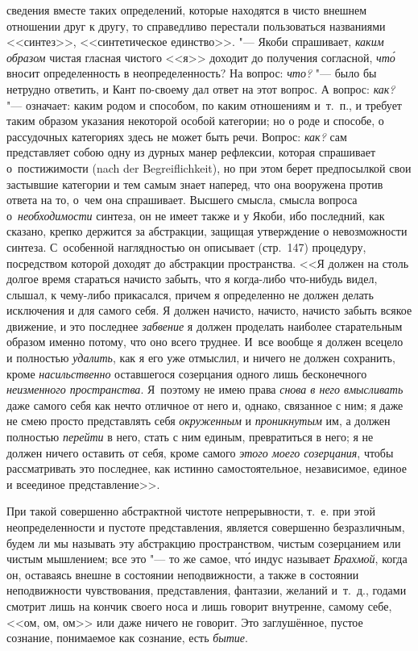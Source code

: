 сведения вместе таких определений, которые находятся в чисто внешнем отношении
друг к другу, то справедливо перестали пользоваться названиями <<синтез>>,
<<синтетическое единство>>. "--- Якоби спрашивает, {\em каким} {\em образом}
чистая гласная чистого <<я>> доходит до получения согласной, {\em чт\'{о}}
вносит определенность в неопределенность? На вопрос: {\em что?} "--- было бы
нетрудно ответить, и Кант по-своему дал ответ на этот вопрос. А вопрос:
{\em как?} "--- означает: каким родом и способом, по каким отношениям и~т.~п.,
и требует таким образом указания некоторой особой категории; но о роде и
способе, о рассудочных категориях здесь не может быть речи. Вопрос: {\em как?}
сам представляет собою одну из дурных манер рефлексии, которая спрашивает
о~постижимости (nach der Begrei\-flich\-keit), но при этом берет предпосылкой
свои застывшие категории и тем самым знает наперед, что она вооружена против
ответа на то, о~чем она спрашивает. Высшего смысла, смысла вопроса
о~{\em необходимости} синтеза, он не имеет также и у Якоби, ибо последний, как
сказано, крепко держится за абстракции, защищая утверждение о невозможности
синтеза. С~особенной наглядностью он описывает (стр.~147) процедуру,
посредством которой доходят до абстракции пространства. <<Я должен на столь
долгое время стараться начисто забыть, что я когда-либо что-нибудь видел,
слышал, к чему-либо прикасался, причем я определенно не должен делать
исключения и для самого себя. Я должен начисто, начисто, начисто забыть всякое
движение, и это последнее {\em забвение} я должен проделать наиболее
старательным образом именно потому, что оно всего труднее. И~все вообще я
должен всецело и полностью {\em удалить}, как я его уже отмыслил, и ничего не
должен сохранить, кроме {\em насильственно} оставшегося созерцания одного лишь
бесконечного {\em неизменного пространства}. Я~поэтому не имею права
{\em снова в него вмысливать} даже самого себя как нечто отличное от него и,
однако, связанное с ним; я даже не смею просто представлять себя
{\em окруженным} и {\em проникнутым} им, а должен полностью {\em перейти} в
него, стать с ним единым, превратиться в него; я не должен ничего оставить от
себя, кроме самого {\em этого моего созерцания}, чтобы рассматривать это
последнее, как истинно самостоятельное, независимое, единое и всеединое
представление>>.

При такой совершенно абстрактной чистоте непрерывности, т.~е. при этой
неопределенности и пустоте представления, является совершенно безразличным,
будем ли мы называть эту абстракцию пространством, чистым созерцанием или
чистым мышлением; все это "--- то же самое, чт\'{о} индус называет
{\em Брахмой}, когда он, оставаясь внешне в состоянии неподвижности, а также в
состоянии неподвижности чувствования, представления, фантазии, желаний и~т.~д.,
годами смотрит лишь на кончик своего носа и лишь говорит внутренне, самому
себе, <<ом, ом, ом>> или даже ничего не говорит. Это заглушённое, пустое
сознание, понимаемое как сознание, есть {\em бытие}.

